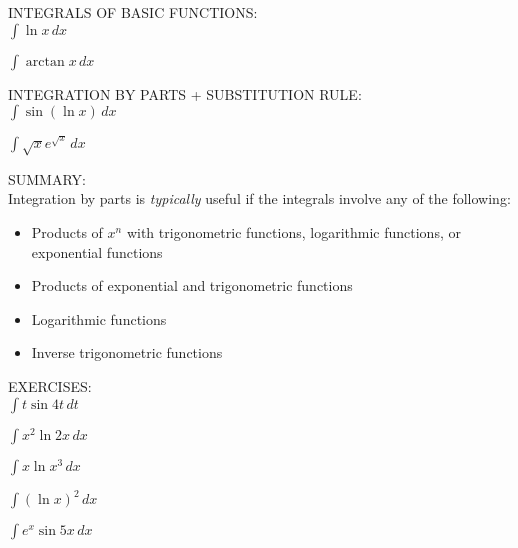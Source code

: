 \documentclass[11pt]{article}
\begin{document}
\pagebreak

INTEGRALS OF BASIC FUNCTIONS:\\


$\int \ln{x} \, dx$

\vspace{2in}

$\int \arctan{x} \, dx$

\vspace{2in}

INTEGRATION BY PARTS + SUBSTITUTION RULE:\\

$\int \sin{(\ln{x})} \, dx$

\vspace{2in}


$\int \sqrt{x}e^{\sqrt{x}} \, dx$

\pagebreak

SUMMARY: \\

Integration by parts is \emph{typically} useful if the integrals involve any of the following:

\begin{itemize}
\item{Products of $x^n$ with trigonometric functions, logarithmic functions, or exponential functions}
\item{Products of exponential and trigonometric functions}
\item{Logarithmic functions}
\item{Inverse trigonometric functions}

  
  \end{itemize}


EXERCISES:\\

$\int t\sin{4t} \, dt$

\vspace{1in}

$\int x^2\ln{2x} \, dx$
\vspace{1in}

$\int x\ln{x^3} \, dx$
\vspace{1in}

$\int (\ln{x})^2 \, dx$

\vspace{1in}

$\int e^x\sin{5x} \, dx$
\end{document}
